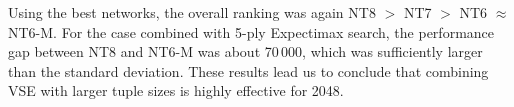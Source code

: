 Using the best networks, the overall ranking was again \textsf{NT8} $>$ \textsf{NT7} $>$ \textsf{NT6} $\approx$ \textsf{NT6-M}.
For the case combined with 5-ply Expectimax search, the performance gap between \textsf{NT8} and \textsf{NT6-M} was about 70\,000, which was sufficiently larger than the standard deviation.
These results lead us to conclude that combining VSE with larger tuple sizes is highly effective for 2048.


